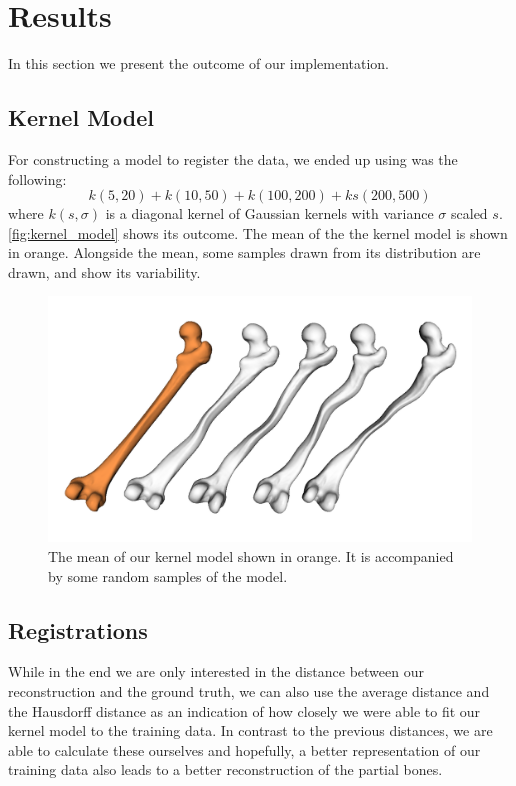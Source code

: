 \section{Results}
\label{sec:results}

In this section we present the outcome of our implementation.


\subsection{Kernel Model}
\label{subsec:kernmodel}

For constructing a model to register the data, we ended up using was the following: 
$$ k(5, 20) + k(10, 50) + k(100, 200) + ks(200, 500) $$
where $k(s, \sigma)$ is a diagonal kernel of Gaussian kernels with variance $\sigma$ scaled $s$. 
\autoref{fig:kernel_model} shows its outcome.
The mean of the the kernel model is shown in orange.
Alongside the mean, some samples drawn from its distribution are drawn, and show its variability.

\begin{figure}
	\centering
  \includegraphics[width=\columnwidth]{./Figures/kernel_model_samples}
  \caption{
    The mean of our kernel model shown in orange. 
    It is accompanied by some random samples of the model.}
  \label{fig:kernel_model}
\end{figure}


\subsection{Registrations}
\label{subsec:registrresults}
While in the end we are only interested in the distance between our reconstruction and the ground truth, we can also use the average distance and the Hausdorff distance as an indication of how closely we were able to fit our kernel model to the training data. 
In contrast to the previous distances, we are able to calculate these ourselves and hopefully, a better representation of our training data also leads to a better reconstruction of the partial bones. 

